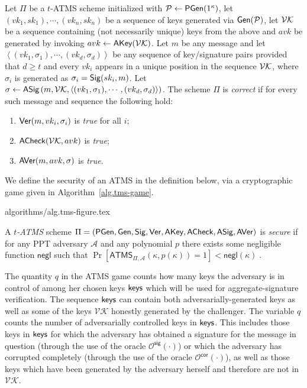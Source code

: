 \begin{definition}
  \label{def:ATMS-correctness}
  Let $\Pi$ be a $t$-ATMS scheme
  initialized with $\mathcal{P} \gets \textsf{PGen}(1^\kappa)$, let
  $(vk_1, sk_1), \cdots, (vk_n, sk_n)$
  be a sequence of keys generated via $\mathsf{Gen}(\mathcal{P})$, let $\mathcal{VK}$ be a sequence
  containing (not necessarily unique) keys from the above and $avk$ be generated
  by invoking $avk \gets \textsf{AKey}(\mathcal{VK})$. Let $m$ be any message and let
  $\left<(vk_1, \sigma_1), \cdots, (vk_d, \sigma_d)\right>$ be any sequence of key/signature pairs provided
  that $d \geq t$ and every $vk_i$ appears in a unique position in the sequence
  $\mathcal{VK}$, where $\sigma_i$ is generated as $\sigma_i = \mathsf{Sig}(sk_i, m)$.
  Let
  $\sigma
  \gets
  \textsf{ASig}\left(
    m,
    \mathcal{VK},
    \left<(vk_1, \sigma_1), \cdots, (vk_d, \sigma_d)\right>
  \right)
  $.
  The scheme $\Pi$ is
  \emph{correct} if for every such message and sequence the following hold:
  \begin{enumerate}
    \item $\mathsf{Ver}(m, vk_i, \sigma_i)$ is \emph{true} for all $i$;
    \item $\textsf{ACheck}(\mathcal{VK}, avk)$ is \emph{true};
    \item $\textsf{AVer}(m, avk, \sigma)$ is \emph{true}.
  \end{enumerate}
\end{definition}

We define the security of an ATMS
in the definition below,
via a cryptographic game given in Algorithm~\ref{alg.tms-game}.

{algorithms/alg.tms-figure.tex}

\begin{definition}[Security]
  \label{def:ATMS-security}
  A \textit{$t$-ATMS} scheme
  $\Pi = (
    \textsf{PGen},
    \mathsf{Gen},
    \mathsf{Sig},
    \mathsf{Ver},
    \textsf{AKey},
    \textsf{ACheck},
    \textsf{ASig},
    \textsf{AVer}
  )$
  is \emph{secure} if for any PPT adversary $\mathcal{A}$ and any polynomial $p$
  there exists some negligible function $\textsf{negl}$ such that
  $
    \Pr[ \textsf{ATMS}_{\Pi, \mathcal{A}}(\kappa, p(\kappa)) = 1]
    < \textsf{negl}(\kappa)
    \; .
  $
\end{definition}

The quantity $q$ in the ATMS game counts how many keys the adversary is in
control of among her chosen keys $\textsf{keys}$ which will be used for
aggregate-signature verification. The sequence $\textsf{keys}$ can contain both
adversarially-generated keys as well as some of the keys $\mathcal{VK}$
honestly generated by the challenger. The variable $q$ counts the number of
adversarially controlled keys in $\textsf{keys}$. This includes those keys in
$\textsf{keys}$ for which the adversary has obtained a signature for the message in
question (through the use of the oracle $\mathcal{O}^\mathsf{sig}(\cdot)$) or which the
adversary has corrupted completely (through the use of the oracle
$\mathcal{O}^\mathsf{cor}(\cdot)$), as well as those keys which have been generated by
the adversary herself and therefore are not in $\mathcal{VK}$.

